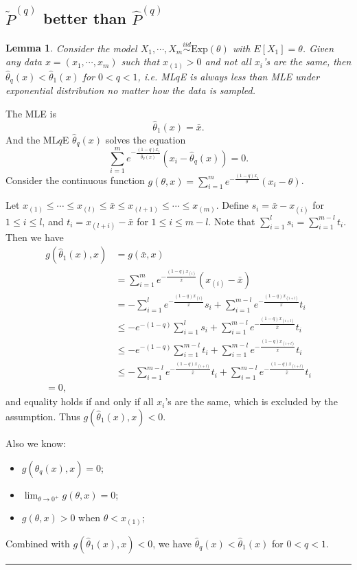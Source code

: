 \documentclass[a4paper]{article}
\newenvironment{proof}{{\bf Proof:  }}{\hfill\rule{2mm}{2mm}}
\newtheorem{lemma}[fact]{Lemma}
\begin{document}
\subsection{$\widetilde{P}^{(q)}$ better than $\hat{P}^{(q)}$}


\begin{lemma}
\label{lemma:LqlMLE}
Consider the model $X_1, \cdots, X_m \stackrel{iid}{\sim} \mathrm{Exp}(\theta)$ with $E[X_1] = \theta$. Given any data $x = (x_1, \cdots, x_m)$ such that $x_{(1)} > 0$ and not all $x_i$'s are the same, then $\hat{\theta}_q(x) < \hat{\theta}_1(x)$ for $0 < q < 1$, i.e. ML$q$E is always less than MLE under exponential distribution no matter how the data is sampled.
\end{lemma}
\begin{proof}
The MLE is
\[
	\hat{\theta}_1(x) = \bar{x}.
\]
And the ML$q$E $\hat{\theta}_q(x)$ solves the equation
\[
	\sum_{i=1}^m e^{-\frac{(1-q)x_i}{\hat{\theta}_q(x)}}(x_i - \hat{\theta}_q(x)) = 0.
\]
Consider the continuous function $g(\theta, x) = \sum_{i=1}^m e^{-\frac{(1-q)x_i}{\theta}}(x_i - \theta)$. 

Let $x_{(1)} \le \cdots \le x_{(l)} \le \bar{x} \le x_{(l+1)} \le \cdots \le x_{(m)}$. Define $s_i = \bar{x} - x_{(i)}$ for $1 \le i \le l$, and $t_{i} = x_{(l+i)} - \bar{x}$ for $1 \le i \le m - l$. Note that $\sum_{i=1}^l s_i = \sum_{i=1}^{m-l} t_i$. Then we have
\begin{align*}
g(\hat{\theta}_1(x), x) & = g(\bar{x}, x) \\
& = \sum_{i=1}^m e^{-\frac{(1-q)x_{(i)}}{\bar{x}}}(x_{(i)} - \bar{x}) \\
& = - \sum_{i=1}^l e^{-\frac{(1-q)x_{(i)}}{\bar{x}}}s_i
+ \sum_{i=1}^{m-l} e^{-\frac{(1-q)x_{(i+l)}}{\bar{x}}}t_i\\
& \le - e^{-(1-q)} \sum_{i=1}^l s_i
+ \sum_{i=1}^{m-l} e^{-\frac{(1-q)x_{(i+l)}}{\bar{x}}}t_i\\
& \le - e^{-(1-q)} \sum_{i=1}^{m-l} t_i
+ \sum_{i=1}^{m-l} e^{-\frac{(1-q)x_{(i+l)}}{\bar{x}}}t_i\\
& \le - \sum_{i=1}^{m-l} e^{-\frac{(1-q)x_{(i+l)}}{\bar{x}}}t_i
+ \sum_{i=1}^{m-l} e^{-\frac{(1-q)x_{(i+l)}}{\bar{x}}}t_i\\
= 0,
\end{align*}
and equality holds if and only if all $x_i$'s are the same, which is excluded by the assumption.
Thus $g(\hat{\theta}_1(x), x) < 0$.

Also we know:
\begin{itemize}
\item $g(\hat{\theta}_q(x), x) = 0$;
\item $\lim_{\theta \rightarrow 0^+}g(\theta, x) = 0$;
\item $g(\theta, x) > 0$ when $\theta < x_{(1)}$;
\end{itemize}
Combined with $g(\hat{\theta}_1(x), x) < 0$, we have $\hat{\theta}_q(x) < \hat{\theta}_1(x)$ for $0 < q < 1$.
\end{proof}
\end{document}
